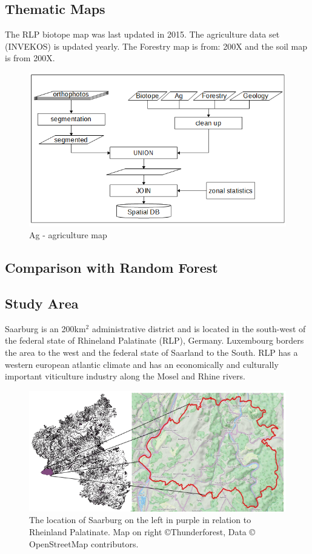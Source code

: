\documentclass[authoryear, review,12pt,number]{elsarticle}
\begin{document}
\subsection{Thematic Maps}
The RLP biotope map was last updated in 2015. The agriculture data set
(INVEKOS) is updated yearly. The Forestry map is from: 200X and the soil map is
from 200X.

\begin{figure}
	\includegraphics[width=1\textwidth]{diagrams/pre_processing.png}
	\caption{Ag - agriculture map}
\end{figure}

\subsection{Comparison with Random Forest}

\subsection{Study Area}
Saarburg is an 200km$^{2}$ administrative district and is located
in the south-west of the federal state of Rhineland Palatinate (RLP), Germany.
Luxembourg borders the area to the west and the federal state of Saarland to the South.
RLP has a western european atlantic climate and has an
economically and culturally important viticulture industry along the Mosel and
Rhine rivers. 
\begin{figure}
	\includegraphics[width=\textwidth]{diagrams/study_area_closeup.png}
	\caption{The location of Saarburg on the left in purple in relation to 
Rheinland Palatinate. Map on right \copyright Thunderforest, Data \copyright 
OpenStreetMap contributors.}
\end{figure}
\end{document}
